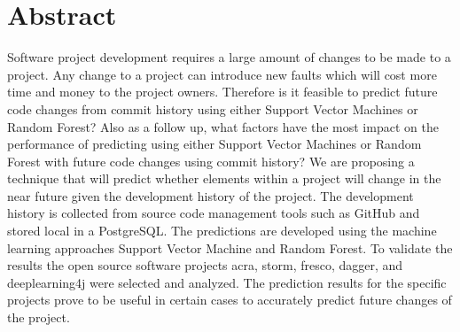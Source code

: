\chapter*{Abstract}

Software project development requires a large amount of changes to be made to a project. Any change to a project can introduce new faults which will cost more time and money to the project owners. Therefore is it feasible to predict future code changes from commit history using either Support Vector Machines or Random Forest? Also as a follow up, what factors have the most impact on the performance of predicting using either Support Vector Machines or Random Forest with future code changes using commit history? We are proposing a technique that will predict whether elements within a project will change in the near future given the development history of the project. The development history is collected from source code management tools such as GitHub and stored local in a PostgreSQL. The predictions are developed using the machine learning approaches Support Vector Machine and Random Forest. To validate the results the open source software projects acra, storm, fresco, dagger, and deeplearning4j were selected and analyzed. The prediction results for the specific projects prove to be useful in certain cases to accurately predict future changes of the project.

